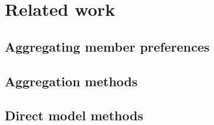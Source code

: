 \chapter{Related work} \label{chap_related_work}

\section{Aggregating member preferences}

\section{Aggregation methods}

\section{Direct model methods}